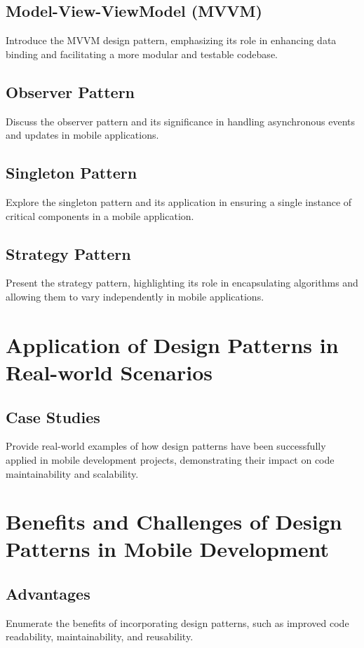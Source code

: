 \documentclass[conference]{IEEEtran}
\begin{document}
	\subsection{Model-View-ViewModel (MVVM)}
	Introduce the MVVM design pattern, emphasizing its role in enhancing data binding and facilitating a more modular and testable codebase.
	
	\subsection{Observer Pattern}
	Discuss the observer pattern and its significance in handling asynchronous events and updates in mobile applications.
	
	\subsection{Singleton Pattern}
	Explore the singleton pattern and its application in ensuring a single instance of critical components in a mobile application.
	
	\subsection{Strategy Pattern}
	Present the strategy pattern, highlighting its role in encapsulating algorithms and allowing them to vary independently in mobile applications.
	
	\section{Application of Design Patterns in Real-world Scenarios}
	\subsection{Case Studies}
	Provide real-world examples of how design patterns have been successfully applied in mobile development projects, demonstrating their impact on code maintainability and scalability.
	
	\section{Benefits and Challenges of Design Patterns in Mobile Development}
	\subsection{Advantages}
	Enumerate the benefits of incorporating design patterns, such as improved code readability, maintainability, and reusability.
	
\end{document}
